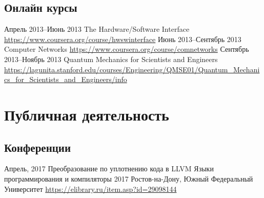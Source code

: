\documentclass[11pt,a4paper]{moderncv}
\begin{document}
  \subsection{Онлайн курсы}
    \cventry
      {Апрель 2013--Июнь 2013}
      {The Hardware/Software Interface}
      {\newline\url{https://www.coursera.org/course/hwswinterface}}
      {}{}{}
    \cventry
      {Июнь 2013--Сентябрь 2013}
      {Computer Networks}
      {\newline\url{https://www.coursera.org/course/comnetworks}}
      {}{}{}
    \cventry
      {Сентябрь 2013--Ноябрь 2013}
      {Quantum Mechanics for Scientists and Engineers}
      {\newline\url{https://lagunita.stanford.edu/courses/Engineering/QMSE01/Quantum_Mechanics_for_Scientists_and_Engineers/info}}
      {}{}{}

\section{Публичная деятельность}
  \subsection{Конференции}
    \cventry
      {Апрель, 2017}
      {Преобразование по уплотнению кода в LLVM}
      {Языки программирования и компиляторы 2017}
      {Ростов-на-Дону, Южный Федеральный Университет}
      {\newline\url{https://elibrary.ru/item.asp?id=29098144}}
      {}{}
\end{document}
